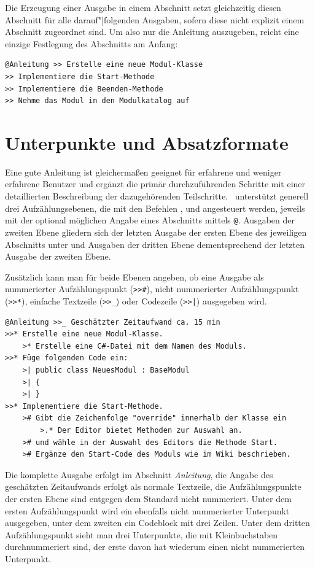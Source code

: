 Die Erzeugung einer Ausgabe in einem Abschnitt setzt gleichzeitig diesen Abschnitt für alle darauf"|folgenden Ausgaben, sofern diese nicht explizit einem Abschnitt zugeordnet sind. Um also nur die Anleitung auszugeben, reicht eine einzige Festlegung des Abschnitts am Anfang:

\begin{verbatim}
@Anleitung >> Erstelle eine neue Modul-Klasse
>> Implementiere die Start-Methode
>> Implementiere die Beenden-Methode
>> Nehme das Modul in den Modulkatalog auf
\end{verbatim}

\section{Unterpunkte und Absatzformate}
Eine gute Anleitung ist gleichermaßen geeignet für erfahrene und weniger erfahrene Benutzer und ergänzt die primär durchzuführenden Schritte mit einer detaillierten Beschreibung der dazugehörenden Teilschritte. \FPZ\ unterstützt generell drei Aufzählungsebenen, die mit den Befehlen \cidxfrag{>\mbox{}>}, \cidxfrag{>} und  angesteuert werden, jeweils mit der optional möglichen Angabe eines Abschnitts mittels \verb|@|. Ausgaben der zweiten Ebene gliedern sich der letzten Ausgabe der ersten Ebene des jeweiligen Abschnitts unter und Ausgaben der dritten Ebene dementsprechend der letzten Ausgabe der zweiten Ebene.

Zusätzlich kann man für beide Ebenen angeben, ob eine Ausgabe als nummerierter Aufzählungspunkt (\verb|>>#|), nicht nummerierter Aufzählungspunkt (\verb|>>*|), einfache Textzeile (\verb|>>_|) oder Codezeile  (\verb=>>|=) ausgegeben wird.

\begin{verbatim}
@Anleitung >>_ Geschätzter Zeitaufwand ca. 15 min
>>* Erstelle eine neue Modul-Klasse.
    >* Erstelle eine C#-Datei mit dem Namen des Moduls.
>>* Füge folgenden Code ein:
    >| public class NeuesModul : BaseModul
    >| {
    >| }
>>* Implementiere die Start-Methode.
    ># Gibt die Zeichenfolge "override" innerhalb der Klasse ein
        >.* Der Editor bietet Methoden zur Auswahl an.
    ># und wähle in der Auswahl des Editors die Methode Start.
    ># Ergänze den Start-Code des Moduls wie im Wiki beschrieben.
\end{verbatim}

Die komplette Ausgabe erfolgt im Abschnitt \emph{Anleitung}, die Angabe des geschätzten Zeitaufwands erfolgt als normale Textzeile, die Aufzählungspunkte der ersten Ebene sind entgegen dem Standard nicht nummeriert. Unter dem ersten Aufzählungspunkt wird ein ebenfalls nicht nummerierter Unterpunkt ausgegeben, unter dem zweiten ein Codeblock mit drei Zeilen. Unter dem dritten Aufzählungspunkt sieht man drei Unterpunkte, die mit Kleinbuchstaben durchnummeriert sind, der erste davon hat wiederum einen nicht nummerierten Unterpunkt.

